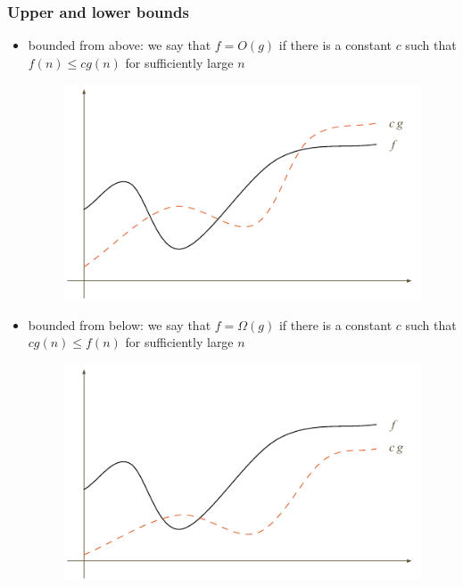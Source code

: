 \begin{frame}[fragile]
%
  \frametitle{Upper and lower bounds}
%
  \begin{itemize}
%
  \item bounded from above: we say that $f = O(g)$ if there is a constant $c$ such that 
    $f(n) \leq c g(n)$ for sufficiently large $n$
%
    \begin{figure}
      \centering
      \includegraphics[scale=.5]{figures/asymptotic-o.pdf}
    \end{figure}
%
  \item bounded from below: we say that $f = \Omega(g)$ if there is a constant $c$ such that 
    $c g(n) \leq f(n)$ for sufficiently large $n$
%
    \begin{figure}
      \centering
      \includegraphics[scale=.5]{figures/asymptotic-omega.pdf}
    \end{figure}
%
  \end{itemize}
%
\end{frame}

